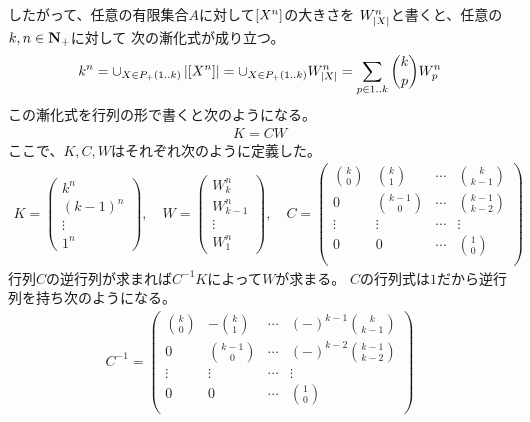 			したがって、任意の有限集合$A$に対して$\left[{X^n}\right]$の大きさを
			$W_{\left|{X}\right|}^n$と書くと、任意の$k,n\in {\mathbf{N}}_+$に対して
			次の漸化式が成り立つ。
			\begin{equation*}\begin{split} %
				k^n = \cup_{X\in P_+(1..k)}\zettai{[X^n]} 
				= \cup_{X\in P_+(1..k)}W_{\zettai{X}}^n
				= \sum_{p\in1..k}\binom{k}{p}W_p^n
			\end{split}\end{equation*} %
			この漸化式を行列の形で書くと次のようになる。
			\begin{equation*}\begin{split} %
				K = CW
			\end{split}\end{equation*} %
			ここで、$K,C,W$はそれぞれ次のように定義した。
			\begin{equation*}\begin{split} %
				K = \begin{pmatrix}
					k^n \\ (k-1)^n \\ \vdots \\ 1^n
				\end{pmatrix} 
				,\quad W = \begin{pmatrix}
					W_k^n \\ W_{k-1}^n \\ \vdots \\ W_1^n
				\end{pmatrix}
				,\quad C = \begin{pmatrix}
					\binom{k}{0} & \binom{k}{1} & \cdots & \binom{k}{k-1} \\
					0 & \binom{k-1}{0} & \cdots & \binom{k-1}{k-2} \\
					\vdots & \vdots & \cdots & \vdots \\
					0 & 0 & \cdots & \binom{1}{0} \\
				\end{pmatrix} 
			\end{split}\end{equation*} %
			行列$C$の逆行列が求まれば$C^{-1}K$によって$W$が求まる。
			$C$の行列式は$1$だから逆行列を持ち次のようになる。
			\begin{equation*}\begin{split} %
				C^{-1} = \begin{pmatrix}
					\binom{k}{0} & -\binom{k}{1} & \cdots & (-)^{k-1}\binom{k}{k-1} \\
					0 & \binom{k-1}{0} & \cdots & (-)^{k-2}\binom{k-1}{k-2} \\
					\vdots & \vdots & \cdots & \vdots \\
					0 & 0 & \cdots & \binom{1}{0} \\
				\end{pmatrix}
			\end{split}\end{equation*} %
